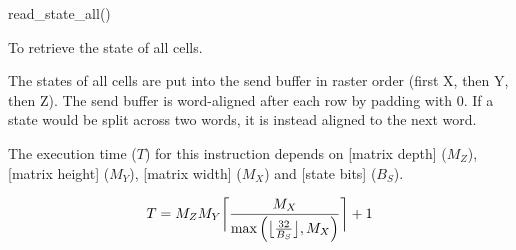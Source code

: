 

\format

read\_state\_all()

\purpose

To retrieve the state of all cells.

\description

The states of all cells are put into the send buffer in raster order (first X, then Y, then Z).
The send buffer is word-aligned after each row by padding with 0.
If a state would be split across two words, it is instead aligned to the next word.

\notes

The execution time ($T$) for this instruction depends on [matrix depth] ($M_Z$), [matrix height] ($M_Y$), [matrix width] ($M_X$) and [state bits] ($B_S$).

$$ T = M_Z M_Y \ceil[\bigg]{ \frac{M_X}{\max \left( \floor[\big]{ \frac{32}{B_S} }, M_X \right)} } + 1 $$
